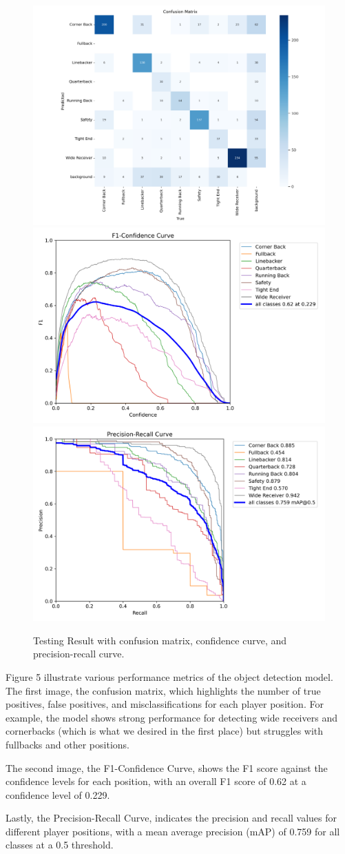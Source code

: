 \begin{figure}[t]
    \centering
    \includegraphics[width=0.4\linewidth]{confusion_matrix.png}
    \includegraphics[width=0.4\linewidth]{confidence_curve.png}
    \includegraphics[width=0.4\linewidth]{precison_curve.png}
    \caption{Testing Result with confusion matrix, confidence curve, and precision-recall curve.}
    \label{fig:result2}
\end{figure}

Figure 5 illustrate various performance metrics of the object detection model. The first image, the confusion matrix, which highlights the number of true positives, false positives, and misclassifications for each player position. For example, the model shows strong performance for detecting wide receivers and cornerbacks (which is what we desired in the first place) but struggles with fullbacks and other positions.

The second image, the F1-Confidence Curve, shows the F1 score against the confidence levels for each position, with an overall F1 score of 0.62 at a confidence level of 0.229. 

Lastly, the Precision-Recall Curve, indicates the precision and recall values for different player positions, with a mean average precision (mAP) of 0.759 for all classes at a 0.5 threshold.

